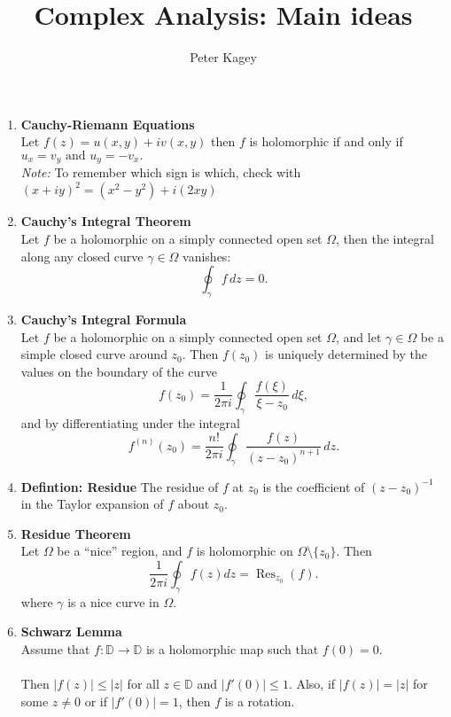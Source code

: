 \documentclass{article}
\begin{document}
\title{Complex Analysis: Main ideas}
\author{Peter Kagey}

\maketitle

\begin{enumerate}
  \item \textbf{Cauchy-Riemann Equations}\\
    Let $f(z) = u(x, y) + iv(x, y)$ then $f$ is holomorphic if and only if $
      u_x = v_y \text{ and } u_y = -v_x.
    $\\
    \textit{Note:} To remember which sign is which, check with
    $(x + iy)^2 = (x^2 - y^2) + i(2xy)$
  \item \textbf{Cauchy's Integral Theorem}\\
    Let $f$ be a holomorphic on a simply connected open set $\Omega$, then the
    integral along any closed curve $\gamma \in \Omega$ vanishes: \[
      \oint_\gamma f\,dz = 0.
    \]
  \item \textbf{Cauchy's Integral Formula}\\
    Let $f$ be a holomorphic on a simply connected open set $\Omega$, and let
    $\gamma \in \Omega$ be a simple closed curve around $z_0$. Then $f(z_0)$ is
    uniquely determined by the values on the boundary of the curve \[
      f(z_0) = \frac{1}{2\pi i}\oint_\gamma \frac{f(\xi)}{\xi - z_0}\,d\xi,
    \] and by differentiating under the integral \[
      f^{(n)}(z_0) = \frac{n!}{2\pi i}\oint_\gamma \frac{f(z)}{(z - z_0)^{n+1}}\,dz.
    \]
  \item \textbf{Defintion: Residue}
    The residue of $f$ at $z_0$ is the coefficient of $(z - z_0)^{-1}$ in the
    Taylor expansion of $f$ about $z_0$.
  \item \textbf{Residue Theorem}\\
    Let $\Omega$ be a ``nice'' region, and $f$ is holomorphic on
    $\Omega \setminus \{z_0\}$. Then \[
      \frac{1}{2\pi i}\oint_\gamma f(z) dz = \operatorname{Res}_{z_0}(f).
    \] where $\gamma$ is a nice curve in $\Omega$.

  \item \textbf{Schwarz Lemma}\\
    Assume that $f\colon \mathbb{D} \rightarrow \mathbb{D}$ is a holomorphic map
    such that $f(0) = 0$.\\~\\
    Then $|f(z)| \leq |z|$ for all $z \in \mathbb{D}$ and $|f'(0)| \leq 1$. Also, if
    $|f(z)| = |z|$ for some $z \not= 0$ or if $|f'(0)| = 1$, then $f$ is a rotation.


\end{enumerate}
\end{document}
